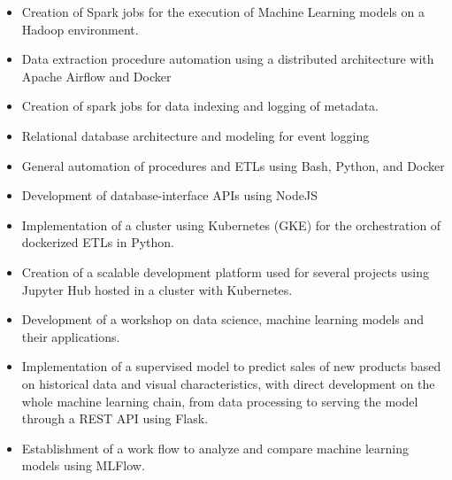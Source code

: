 \documentclass[10pt,a4paper,ragged2e,withhyper]{altacv}
\begin{document}
\begin{paracol}{2}
\begin{quote}
            \end{quote}
        
            \begin{itemize}
                \item Creation of Spark jobs for the execution of Machine Learning models on a Hadoop environment.
            \end{itemize}
            \divider
            
            \begin{itemize}
                \item Data extraction procedure automation using a distributed architecture with Apache Airflow and Docker
                \item Creation of spark jobs for data indexing and logging of metadata.
                \item Relational database architecture and modeling for event logging
                \item General automation of procedures and ETLs using Bash, Python, and Docker
                \item Development of database-interface APIs using NodeJS
            \end{itemize}
            \divider
            
            \begin{itemize}
                \item Implementation of a cluster using Kubernetes (GKE) for the orchestration of dockerized ETLs in Python.
                \item Creation of a scalable development platform used for several projects using Jupyter Hub hosted in a cluster with Kubernetes.
                \item Development of a workshop on data science, machine learning models and their applications.
                \item Implementation of a supervised model to predict sales of new products based on historical data and visual
                characteristics, with direct development on the whole machine learning chain, from data processing to serving
                the model through a REST API using Flask.
                \item Establishment of a work flow to analyze and compare machine learning models using MLFlow.
            \end{itemize}
            \divider


\end{paracol}
\end{document}
